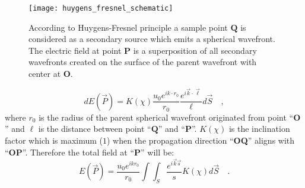 \begin{figure}[t!]
  \centering
  \texttt{[image: huygens\_fresnel\_schematic]}
  \caption{According to Huygens-Fresnel principle a sample point $\mathbf{Q}$ is considered as a secondary source which emits a spherical wavefront. The electric field at point $\mathbf{P}$ is a superposition of all secondary wavefronts created on the surface of the parent wavefront with center at $\mathbf{O}$.}
  \label{fig:huygens_fresnel}
\end{figure}


\begin{equation}
\label{eq:huygen_fresnel}
dE(\vec{P}) = K(\chi) \frac{u_0 e^{ik \cdot r_0}}{r_0}\frac{e^{i\vec{k}\cdot\vec{\ell}}}{\ell} d\vec{S} \quad ,
\end{equation}
where $r_0$ is the radius of the parent spherical wavefront originated from point ``$\mathbf{O}$'' and $\ell$ is the distance between point ``$\mathbf{Q}$'' and ``$\mathbf{P}$''. $K(\chi)$ is the inclination factor which is maximum ($1$) when the propagation direction ``\textbf{OQ}'' aligns with ``\textbf{OP}''. Therefore the total field at ``\textbf{P}'' will be:
\begin{equation}
\label{eq:E_P}
E(\vec{P}) =  \frac{u_0 e^{ikr_0}}{r_0} \int \int _{S} \frac{e^{i\vec{k}\vec{s}}}{s}  K(\chi) d\vec{S} \quad .
\end{equation}

